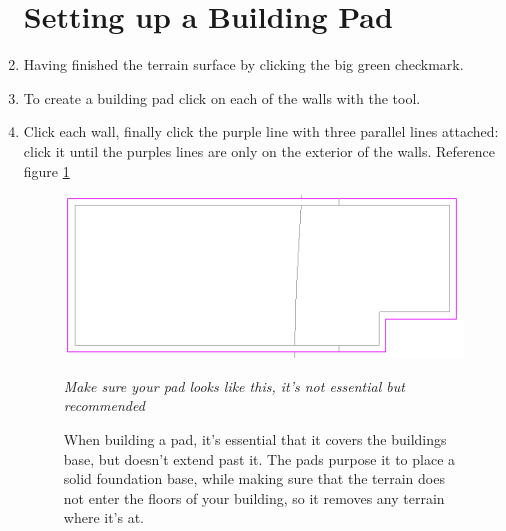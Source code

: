 \documentclass{tufte-book} %
\begin{document}
\begin{enumerate}
	\section{Setting up a Building Pad}
	\item Having finished the terrain surface by clicking the big green checkmark.
	\item To create a building pad click on each of the walls with the  tool.
	\item Click each wall, finally click the purple line with three parallel lines attached: click it until the purples lines are only on the exterior of the walls. Reference figure \ref{fig:revtopopad}
	\begin{figure}
		\includegraphics[width=\linewidth]{revittopographicpad.png}
		\caption[Building Pad Lines]{When building a pad, it's essential that it covers the buildings base, but doesn't extend past it. The pads purpose it to place a solid foundation base, while making sure that the terrain does not enter the floors of your building, so it removes any terrain where it's at.}
		\emph{Make sure your pad looks like this, it's not essential but recommended}
		\label{fig:revtopopad}
	\end{figure}

\end{enumerate}
\end{document}
